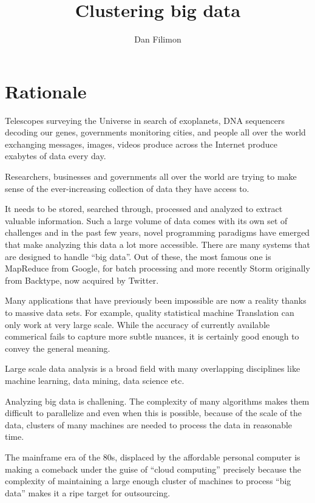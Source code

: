 \documentclass{article}
\title{Clustering big data}
\author{Dan Filimon}
\begin{document}
\maketitle

\tableofcontents

\pagebreak

\section{Rationale}

Telescopes surveying the Universe in search of exoplanets, DNA sequencers
decoding our genes, governments monitoring cities, and people all over the
world exchanging messages, images, videos produce across the Internet produce
exabytes of data every day.

Researchers, businesses and governments all over the world are trying to make
sense of the ever-increasing collection of data they have access to.

It needs to be stored, searched through, processed and analyzed to extract
valuable information.
Such a large volume of data comes with its own set of challenges and in the
past few years, novel programming paradigms have emerged that make analyzing
this data a lot more accessible.
There are many systems that are designed to handle ``big data''. Out of these, the most famous one is MapReduce \cite{mr1} from Google, for batch
processing and more recently Storm \cite{storm} originally from Backtype, now acquired by
Twitter.

Many applications that have previously been impossible are now a reality thanks
to massive data sets. For example, quality statistical machine Translation can only
work at very large scale. While the accuracy of currently available commerical
fails to capture more subtle nuances, it is certainly good enough to convey the
general meaning.

Large scale data analysis is a broad field with many overlapping disciplines
like machine learning, data mining, data science etc.

Analyzing big data is challening. The complexity of many algorithms makes them
difficult to parallelize and even when this is possible, because of the scale
of the data, clusters of many machines are needed to process the data in
reasonable time.

The mainframe era of the 80s, displaced by the affordable
personal computer is making a comeback under the guise of ``cloud computing''
precisely because the complexity of maintaining a large enough cluster of machines
to process ``big data'' makes it a ripe target for outsourcing.
\end{document}
